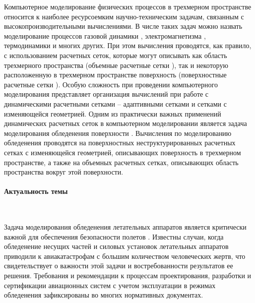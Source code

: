 
Компьютерное моделирование физических процессов в трехмерном пространстве относится к наиболее ресурсоемким научно-техническим задачам, связанным с высокопроизводительными вычислениями.
В числе таких задач можно назвать моделирование процессов газовой динамики \cite{Lobanova2023GeneralGas}, электромагнетизма \cite{Taboada2013GeneralElectro}, термодинамики \cite{Liu2020GeneralThermo} и многих других.
При этом вычисления проводятся, как правило, с использованием расчетных сеток, которые могут описывать как область трехмерного пространства (объемные расчетные сетки \cite{Kudryavzeva2014GeneralVolumeMesh}), так и некоторую расположенную в трехмерном пространстве поверхность (поверхностные расчетные сетки \cite{Zheleznyakova2016GeneralSurfMesh}).
Особую сложность при проведении компьютерного моделирования представляет организация вычислений при работе с динамическими расчетными сетками -- адаптивными сетками \cite{Li2014Film} и сетками с изменяющейся геометрией.
Одним из практически важных применений динамических расчетных сеток в компьютерном моделировании является задача моделирования обледенения поверхности \cite{Koshelev2020Ice}.
Вычисления по моделированию обледенения проводятся на поверхностных неструктурированных расчетных сетках с изменяющейся геометрией, описывающих поверхность в трехмерном пространстве, а также на объемных расчетных сетках, описывающих область пространства вокруг этой поверхности.

\paragraph{Актуальность темы} \


Задача моделирования обледенения летательных аппаратов является критически важной для обеспечения безопасности полетов \cite{Raj2020IntroIce}.
Известны случаи, когда обледенение несущих частей и силовых установок летательных аппаратов приводили к авиакатастрофам с большим количеством человеческих жертв,
что свидетельствует о важности этой задачи и востребованности результатов ее решения.
Требования и рекомендации к процессам проектирования, разработки и сертификации авиационных систем с учетом эксплуатации в режимах обледенения зафиксированы во многих нормативных документах.

